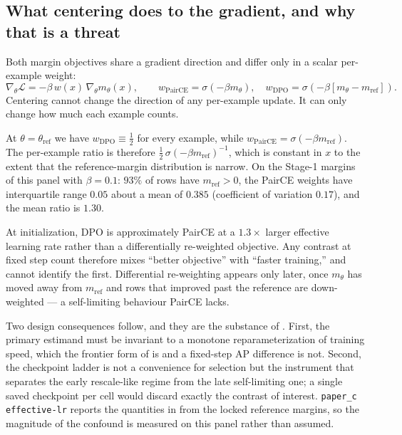 \subsection{What centering does to the gradient, and why that is a threat}

Both margin objectives share a gradient direction and differ only in a scalar
per-example weight:
\begin{equation}
\nabla_\theta \mathcal{L}
= -\beta\,w(x)\,\nabla_\theta m_\theta(x),
\qquad
w_{\mathrm{PairCE}}=\sigma(-\beta m_\theta),
\quad
w_{\mathrm{DPO}}=\sigma\!\left(-\beta\left[m_\theta-m_{\mathrm{ref}}\right]\right).
\end{equation}
Centering cannot change the direction of any per-example update. It can only
change how much each example counts.

\begin{lemma}
\label{lem:rescale}
At $\theta=\theta_{\mathrm{ref}}$ we have $w_{\mathrm{DPO}}\equiv\tfrac12$ for
every example, while $w_{\mathrm{PairCE}}=\sigma(-\beta m_{\mathrm{ref}})$. The
per-example ratio is therefore
$\tfrac12\,\sigma(-\beta m_{\mathrm{ref}})^{-1}$, which is constant in $x$ to the
extent that the reference-margin distribution is narrow. On the Stage-1 margins of
this panel with $\beta=0.1$: $93\%$ of rows have $m_{\mathrm{ref}}>0$, the PairCE
weights have interquartile range $0.05$ about a mean of $0.385$
(coefficient of variation $0.17$), and the mean ratio is $1.30$.
\end{lemma}

\begin{corollary}
At initialization, DPO is approximately PairCE at a $1.3\times$ larger effective
learning rate rather than a differentially re-weighted objective. Any contrast at
fixed step count therefore mixes ``better objective'' with ``faster training,''
and cannot identify the first. Differential re-weighting appears only later, once
$m_\theta$ has moved away from $m_{\mathrm{ref}}$ and rows that improved past the
reference are down-weighted --- a self-limiting behaviour PairCE lacks.
\end{corollary}

Two design consequences follow, and they are the substance of
. First, the primary estimand must be invariant to a
monotone reparameterization of training speed, which the frontier form of
 is and a fixed-step AP difference is not. Second, the
checkpoint ladder is not a convenience for selection but the instrument that
separates the early rescale-like regime from the late self-limiting one; a
single saved checkpoint per cell would discard exactly the contrast of interest.
\verb|paper_c effective-lr| reports the quantities in  from the
locked reference margins, so the magnitude of the confound is measured on this
panel rather than assumed.

